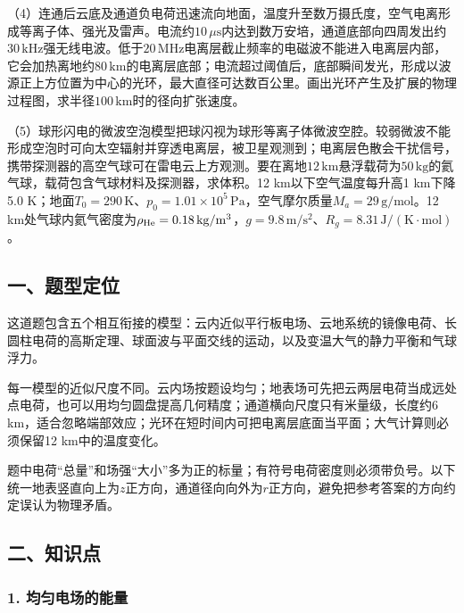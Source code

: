 \documentclass[12pt,a4paper,fontset=fandol]{ctexart}
\begin{document}
（4）连通后云底及通道负电荷迅速流向地面，温度升至数万摄氏度，空气电离形成等离子体、强光及雷声。电流约\(10\,\mu\mathrm s\)内达到数万安培，通道底部向四周发出约\(30\,\mathrm{kHz}\)强无线电波。低于\(20\,\mathrm{MHz}\)电离层截止频率的电磁波不能进入电离层内部，它会加热离地约\(80\,\mathrm{km}\)的电离层底部；电流超过阈值后，底部瞬间发光，形成以波源正上方位置为中心的光环，最大直径可达数百公里。画出光环产生及扩展的物理过程图，求半径\(100\,\mathrm{km}\)时的径向扩张速度。

（5）球形闪电的微波空泡模型把球闪视为球形等离子体微波空腔。较弱微波不能形成空泡时可向太空辐射并穿透电离层，被卫星观测到；电离层色散会干扰信号，携带探测器的高空气球可在雷电云上方观测。要在离地\(12\,\mathrm{km}\)悬浮载荷为\(50\,\mathrm{kg}\)的氦气球，载荷包含气球材料及探测器，求体积。12
km以下空气温度每升高1 km下降5.0
K；地面\(T_0=290\,\mathrm K\)、\(p_0=1.01\times10^5\,\mathrm{Pa}\)，空气摩尔质量\(M_a=29\,\mathrm{g/mol}\)。12
km处气球内氦气密度为\(\rho_{\rm He}=0.18\,\mathrm{kg/m^3}\)，\(g=9.8\,\mathrm{m/s^2}\)、\(R_g=8.31\,\mathrm{J/(K\cdot mol)}\)。

\subsection{一、题型定位}\label{ux4e00ux9898ux578bux5b9aux4f4d-6}

这道题包含五个相互衔接的模型：云内近似平行板电场、云地系统的镜像电荷、长圆柱电荷的高斯定理、球面波与平面交线的运动，以及变温大气的静力平衡和气球浮力。

每一模型的近似尺度不同。云内场按题设均匀；地表场可先把云两层电荷当成远处点电荷，也可以用均匀圆盘提高几何精度；通道横向尺度只有米量级，长度约6
km，适合忽略端部效应；光环在短时间内可把电离层底面当平面；大气计算则必须保留12
km中的温度变化。

题中电荷``总量''和场强``大小''多为正的标量；有符号电荷密度则必须带负号。以下统一地表竖直向上为\(z\)正方向，通道径向向外为\(r\)正方向，避免把参考答案的方向约定误认为物理矛盾。

\subsection{二、知识点}\label{ux4e8cux77e5ux8bc6ux70b9-6}

\subsubsection{1.
均匀电场的能量}\label{ux5747ux5300ux7535ux573aux7684ux80fdux91cf}
\end{document}
